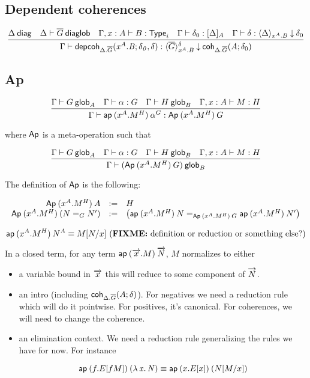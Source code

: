 \subsection{Dependent coherences}

\begin{small}
\[
\infer
  {\ofdepglob{\Gamma}{\depcoh{\Delta.\diag G}{x^A.B}{\delta_0}{\delta}}
    {\interpdepglob{\diag G}{x^A.B}{\delta}}{\coh{\Delta.\diag G}{A}{\delta_0}}}
  {\wfdiag{\Delta}
  &\wfdiaglob{\Delta}{\diag G}
  &\wftype{\Gamma,x:A}{B}
  &\ofinterp{\Gamma}{\delta_0}{\Delta}{A}
  &\ofinterpdep{\Gamma}{\delta}{\Delta}{x^A.B}{\delta_0}}
\]
\end{small}

\subsection{Ap}

\begin{small}
  \[\infer{\ofglob{\Gamma}{\ap{(x^A.M^H)}{\alpha^G}}
    {\Ap{(x^A.M^H)}{G}}}
  {\wfglob{\Gamma}{G}{A}
    & \ofglob{\Gamma}{\alpha}{G}
    & \wfglob{\Gamma}{H}{B}
    & \ofglob{\Gamma,x:A}{M}{H}}\]

  where $\dsd{Ap}$ is a meta-operation such that

  \[\infer{\wfglob{\Gamma}{(\Ap{(x^A.M^H)}{G})}
    {B}}
  {\wfglob{\Gamma}{G}{A}
    & \ofglob{\Gamma}{\alpha}{G}
    & \wfglob{\Gamma}{H}{B}
    & \ofglob{\Gamma,x:A}{M}{H}}\]

  The definition of $\dsd{Ap}$ is the following:

  \[
  \begin{array}{rcl}
    \Ap{(x^A.M^H)}{A} & := & H \\
    \Ap{(x^A.M^H)}{(\homj{G}{N}{N'})} & := & \left(
      \homj{\Ap{(x^A.M^H)}{G}}
      {\ap{(x^A.M^H)}{N}}{\ap{(x^A.M^H)}{N'}}\right)
  \end{array}
  \]
\end{small}

\begin{small}
  \[
  \ap{(x^A.M^H)}{N^A}  \equiv  \subst{M}{N}{x}
  \text{ (\FIXME{definition or reduction or something else?})} \\ \\
  \]
\end{small}

In a closed term, for any term $\ap{(\tel{x}.M)}{\tel{N}}$, $M$ normalizes to
either
\begin{itemize}
\item a variable bound in $\tel{x}$ this will reduce to some component of
  $\tel{N}$.
\item an intro (including $\coh{\Delta.\diag G}{A}{\delta}$). For negatives we
  need a reduction rule which will do it pointwise. For positives, it’s
  canonical. For coherences, we will need to change the coherence.
\item an elimination context. We need a reduction rule generalizing the rules we
  have for now. For instance

\[\ap{(f.E[f M])}{(\ulam{x}{N})} \equiv \ap{(x.E[x])}{(\subst{N}{M}{x})}\]

\end{itemize}

